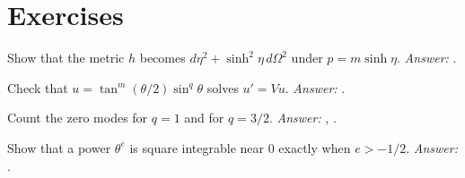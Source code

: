 \section*{Exercises}
\begin{exercise}Show that the metric $h$ becomes $d\eta^2+\sinh^2\eta\,d\Omega^2$ under $p=m\sinh\eta$. \emph{Answer:} .\end{exercise}
\begin{exercise}Check that $u=\tan^m(\theta/2)\sin^q\theta$ solves $u'=Vu$. \emph{Answer:} .\end{exercise}
\begin{exercise}Count the zero modes for $q=1$ and for $q=3/2$. \emph{Answer:} , .\end{exercise}
\begin{exercise}Show that a power $\theta^e$ is square integrable near $0$ exactly when $e>-1/2$. \emph{Answer:} .\end{exercise}
